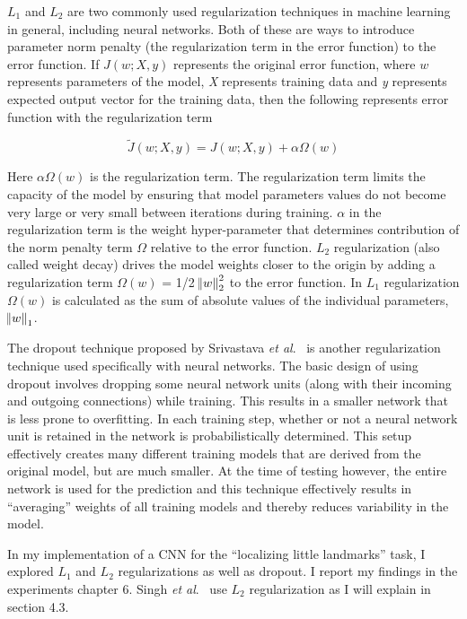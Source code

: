 \documentclass [11pt,letterpaper ,twoside ,openany ]{report}
\begin{document}
    \(L_1\) and \(L_2\) are two commonly used regularization techniques in machine learning in general, including neural networks. Both of these are ways to introduce parameter norm penalty (the regularization term in the error function) to the error function. If \(J(w; X, y) \) represents the original error function, where \(w\) represents parameters of the model, \textit{X} represents training data and \textit{y} represents expected output vector for the training data, then the following represents error function with the regularization term

    \[ \widetilde{J}(w; X, y) = J(w; X, y) + \alpha \Omega(w)   \]

    Here \(\alpha \Omega(w)\) is the regularization term. The regularization term limits the capacity of the model by ensuring that model parameters values do not become very large or very small between iterations during training. \(\alpha\) in the regularization term is the weight hyper-parameter that determines contribution of the norm penalty term \(\Omega\) relative to the error function. \(L_2\) regularization (also called weight decay) drives the model weights closer to the origin by adding a regularization term \( \Omega(w)\) = 1/2 \( \norm{w}^{2}_{2}  \) to the error function. In \(L_1\) regularization \( \Omega(w)\) is calculated as the sum of absolute values of the individual parameters, \( \norm{w}_{1} \). 

    The dropout technique proposed by Srivastava \textit{et al}.\ \cite{srivastava2014dropout} is another regularization technique used specifically with neural networks. The basic design of using dropout involves dropping some neural network units (along with their incoming and outgoing connections) while training. This results in a smaller network that is less prone to overfitting. In each training step, whether or not a neural network unit is retained in the network is probabilistically determined. This setup effectively creates many different training models that are derived from the original model, but are much smaller. At the time of testing however, the entire network is used for the prediction and this technique effectively results in ``averaging'' weights of all training models and thereby reduces variability in the model.

    In my implementation of a CNN for the ``localizing little landmarks'' task, I explored \(L_1\) and \(L_2\) regularizations as well as dropout. I report my findings in the experiments chapter 6. Singh \textit{et al}.\ \cite{Singh_2016_CVPR} use \(L_2\) regularization as I will explain in section 4.3.
\end{document}
